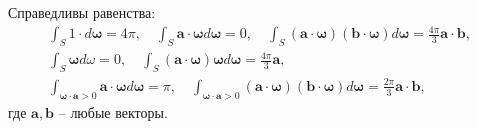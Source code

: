 \begin{lemma}
    \label{lm:1:1}
    Справедливы равенства:
    \[
        \begin{gathered}
            \int_{S} 1 \cdot d \boldsymbol{\omega}=4 \pi, \quad \int_{S} \mathbf{a}
            \cdot \boldsymbol{\omega} d \boldsymbol{\omega}=0,
            \quad \int_{S}(\mathbf{a} \cdot \boldsymbol{\omega})(\mathbf{b} \cdot \boldsymbol{\omega}) d
            \boldsymbol{\omega}=\frac{4 \pi}{3} \mathbf{a} \cdot \mathbf{b}, \\
            \int_{S} \boldsymbol{\omega} d \omega=0,
            \quad \int_{S}(\mathbf{a} \cdot \boldsymbol{\omega}) \boldsymbol{\omega} d
            \boldsymbol{\omega}=\frac{4 \pi}{3} \mathbf{a}, \\
            \int_{\boldsymbol{\omega} \cdot \mathbf{a}>0} \mathbf{a} \cdot \boldsymbol{\omega} d
            \boldsymbol{\omega}=\pi, \quad \int_{\boldsymbol{\omega} \cdot \mathbf{a}>0}(\mathbf{a} \cdot
            \boldsymbol{\omega})(\mathbf{b} \cdot \boldsymbol{\omega}) d \boldsymbol{\omega}
            = \frac{2 \pi}{3} \mathbf{a} \cdot \mathbf{b},
        \end{gathered}
    \]
    где $\mathbf{a}, \mathbf{b}$ -- любые векторы.
\end{lemma}
%
%
%

